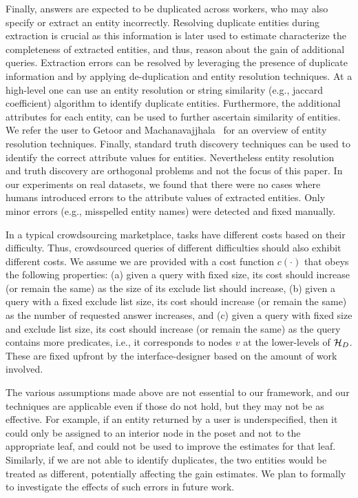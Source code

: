 \iftr
Finally, answers are expected to be duplicated across workers, who may also specify or extract an entity incorrectly. Resolving duplicate entities during extraction is crucial as this information is later used to estimate characterize the completeness of extracted entities, and thus, reason about the gain of additional queries.  Extraction errors can be resolved by leveraging the presence of duplicate information and by applying de-duplication and entity resolution techniques. At a high-level one can use an entity resolution or string similarity (e.g., jaccard coefficient) algorithm to identify duplicate entities. Furthermore, the additional attributes for each entity, can be used to further ascertain similarity of entities. We refer the user to Getoor and Machanavajjhala~\cite{getoor:kdd13} for an overview of entity resolution techniques. Finally, standard truth discovery techniques can be used to identify the correct attribute values for entities. Nevertheless entity resolution and truth discovery are orthogonal problems and not the focus of this paper. In our experiments on real datasets, we found that there were no cases where humans introduced errors to the attribute values of extracted entities. Only minor errors (e.g., misspelled entity names) were detected and fixed manually. \fi

 In a typical crowdsourcing marketplace, tasks have different costs based on their difficulty. Thus, crowdsourced queries of different difficulties should also exhibit different costs. We assume we are provided with a cost function $c(\cdot)$ that obeys the following properties:  (a) given a query with fixed size, its cost should increase (or remain the same) as the size of its exclude list should increase, (b) given a query with a fixed exclude list size, its cost should increase (or remain the same) as the number of requested answer increases, and (c) given a query with fixed size and exclude list size, its cost should increase (or remain the same) as the query contains more predicates, i.e., it corresponds to nodes $v$ at the lower-levels of $\mathcal{H}_D$. These are fixed upfront by the interface-designer based on the amount of work involved.

 The various assumptions made above are not essential to our framework, and our techniques are applicable even if those do not hold, but they may not be as effective. For example, if an entity returned by a user is underspecified, then it could only be assigned to an interior node in the poset and not to the appropriate leaf, and could not be used to improve the estimates for that leaf. Similarly, if we are not able to identify duplicates, the two entities would be treated as different, potentially affecting the gain estimates. We plan to formally to investigate the effects of such errors in future work.


